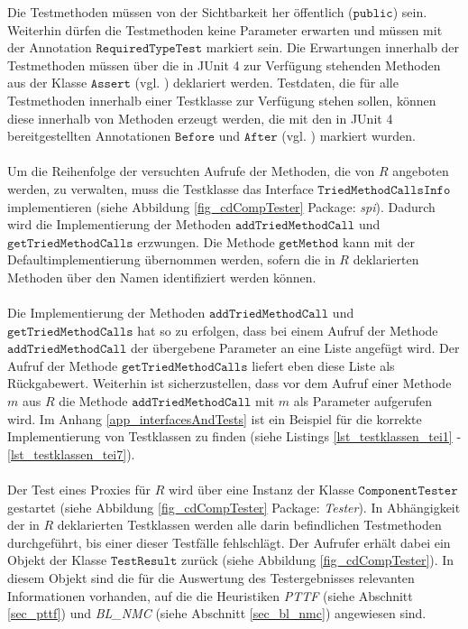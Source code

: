 \noindent
Die Testmethoden müssen von der Sichtbarkeit her öffentlich ($\texttt{public}$) sein. Weiterhin dürfen die Testmethoden keine Parameter erwarten und müssen mit der Annotation $\texttt{RequiredTypeTest}$ markiert sein. Die Erwartungen innerhalb der Testmethoden müssen über die in JUnit 4 zur Verfügung stehenden Methoden aus der Klasse $\texttt{Assert}$ (vgl. \cite{junit_api}) deklariert werden. Testdaten, die für alle Testmethoden innerhalb einer Testklasse zur Verfügung stehen sollen, können diese innerhalb von Methoden erzeugt werden, die mit den in JUnit 4 bereitgestellten Annotationen $\texttt{Before}$ und $\texttt{After}$ (vgl. \cite{junit_api}) markiert wurden.
\\\\
Um die Reihenfolge der versuchten Aufrufe der Methoden, die von $R$ angeboten werden, zu verwalten, muss die Testklasse das Interface $\texttt{TriedMethodCallsInfo}$ implementieren (siehe Abbildung \ref{fig_cdCompTester} Package: \emph{spi}). Dadurch wird die Implementierung der Methoden $\texttt{addTriedMethodCall}$ und $\texttt{getTriedMethodCalls}$ erzwungen. Die Methode $\texttt{getMethod}$ kann mit der Defaultimplementierung übernommen werden, sofern die in $R$ deklarierten Methoden über den Namen identifiziert werden können.
\\\\
Die Implementierung der Methoden $\texttt{addTriedMethodCall}$ und $\texttt{getTriedMethodCalls}$ hat so zu erfolgen, dass bei einem Aufruf der Methode $\texttt{addTriedMethodCall}$ der übergebene Parameter an eine Liste angefügt wird. Der Aufruf der Methode $\texttt{getTriedMethodCalls}$ liefert eben diese Liste als Rückgabewert. Weiterhin ist sicherzustellen, dass vor dem Aufruf einer Methode $m$ aus $R$ die Methode $\texttt{addTriedMethodCall}$ mit $m$ als Parameter aufgerufen wird. Im Anhang \ref{app_interfacesAndTests} ist ein Beispiel für die korrekte Implementierung von Testklassen zu finden (siehe Listings \ref{lst_testklassen_tei1} - \ref{lst_testklassen_tei7}).
\\\\
Der Test eines Proxies für $R$ wird über eine Instanz der Klasse $\texttt{ComponentTester}$ gestartet (siehe Abbildung \ref{fig_cdCompTester} Package: \emph{Tester}). In Abhängigkeit der in $R$ deklarierten Testklassen werden alle darin befindlichen Testmethoden durchgeführt, bis einer dieser Testfälle fehlschlägt. Der Aufrufer erhält dabei ein Objekt der Klasse $\texttt{TestResult}$ zurück (siehe Abbildung \ref{fig_cdCompTester}). In diesem Objekt sind die für die Auswertung des Testergebnisses relevanten Informationen vorhanden, auf die die Heuristiken \emph{PTTF} (siehe Abschnitt \ref{sec_pttf}) und \emph{BL\_NMC} (siehe Abschnitt \ref{sec_bl_nmc}) angewiesen sind.
